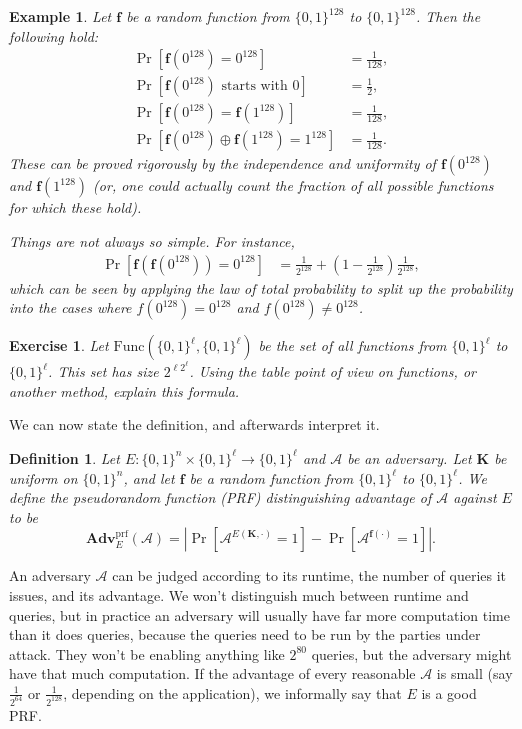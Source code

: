 \documentclass[11pt]{article}
\newtheorem{exercise}{Exercise}
\newtheorem{definition}{Definition}
\newtheorem{example}{Example}
\newcommand{\calA}{\mathcal{A}}
\newcommand{\Adv}{\mathbf{Adv}}
\newcommand{\AdvPRF}[2]{\Adv^{\mathrm{prf}}_{#1}({#2})}
\newcommand{\bits}{\{0,1\}}
\newcommand{\bK}{\mathbf{K}}
\newcommand{\bof}{\mathbf{f}}
\newcommand{\Func}{\mathrm{Func}}
\begin{document}
\begin{example}
Let $\bof$ be a random function from $\bits^{128}$ to $\bits^{128}$.
Then the following hold:
    \begin{align*}
        \Pr[\bof(0^{128}) = 0^{128}] &= \frac{1}{128}, \\
        \Pr[\bof(0^{128}) \text{ starts with $0$}] &= \frac{1}{2}, \\
        \Pr[\bof(0^{128}) = \bof(1^{128})] &= \frac{1}{128}, \\
        \Pr[\bof(0^{128}) \oplus \bof(1^{128}) = 1^{128}] &= \frac{1}{128}.
    \end{align*}
    These can be proved rigorously by the independence and uniformity of
    $\bof(0^{128})$ and $\bof(1^{128})$ (or, one could actually count
    the fraction of all possible functions for which these hold).
    
    Things are not always so simple. For instance,
    \begin{align*}
        \Pr[\bof(\bof(0^{128})) = 0^{128}] &= 
        \frac{1}{2^{128}} + (1-\frac{1}{2^{128}})\frac{1}{2^{128}},
    \end{align*}
    which can be seen by applying the law of total probability to split
    up the probability into the cases where $f(0^{128})=0^{128}$ and
     $f(0^{128})\neq0^{128}$.
\end{example}

\begin{exercise}
    Let $\Func(\bits^\ell,\bits^\ell)$ be the set of all functions from
$\bits^\ell$ to $\bits^\ell$. This set has size $2^{\ell2^\ell}$. Using the
table point of view on functions, or another method, explain this formula.
\end{exercise}

We can now state the definition, and afterwards interpret it.
\begin{definition}
    Let $E:\bits^n\times\bits^\ell\to\bits^\ell$ and $\calA$ be an adversary.
    Let $\bK$ be uniform on $\bits^n$, and let $\bof$ be a random function
    from $\bits^\ell$ to $\bits^\ell$.
    We define the \emph{pseudorandom function (PRF) distinguishing advantage
    of $\calA$ against $E$} to be
    \[
        \AdvPRF{E}{\calA} =
        \left|\Pr[\calA^{E(\bK,\cdot)}=1]-\Pr[\calA^{\bof(\cdot)}=1]\right|.
    \]
\end{definition}

An adversary $\calA$ can be judged according to its runtime, the number of
queries it issues, and its advantage. We won't distinguish much between runtime
and queries, but in practice an adversary will usually have far more
computation time than it does queries, because the queries need to be run by
the parties under attack. They won't be enabling anything like $2^{80}$ queries,
but the adversary might have that much computation.  If the advantage of every
reasonable $\calA$ is small (say $\frac{1}{2^{64}}$ or $\frac{1}{2^{128}}$,
depending on the application), we informally say that $E$ is a good PRF. 
\end{document}
